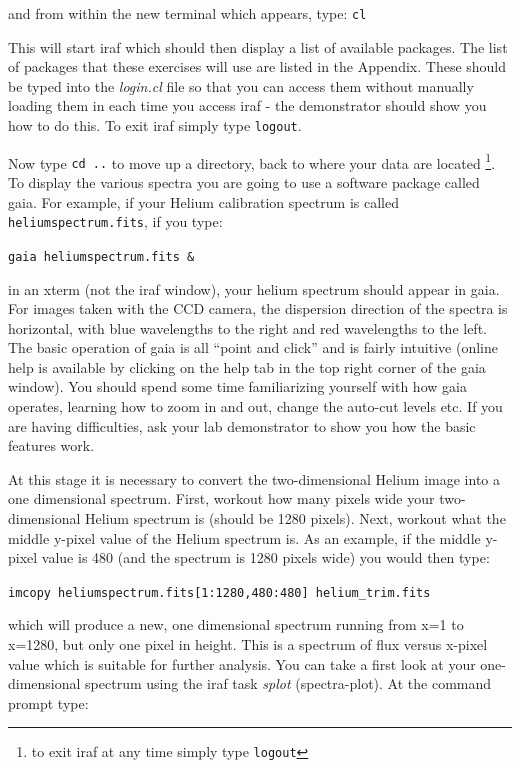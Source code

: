 \documentclass[12pt]{article}
\begin{document}
\noindent
and from within the new terminal which appears, type: {\tt cl}

\noindent
This will start {\sc iraf} which should then display a list of available
packages. The list of packages that these exercises will use are listed in the Appendix. These should be typed into the {\it login.cl} file so that you can access them without manually loading them in each time you access {\sc iraf} - the demonstrator should show you how to do this. To exit {\sc iraf} simply type {\tt logout}.

Now type {\tt cd ..} to move up a directory, back to where
your data are located \footnote{to exit {\sc iraf} at any time simply type {\tt logout}}. To display the various spectra you are going to use a software package called {\sc gaia}. For example, if your Helium calibration spectrum is
called {\tt heliumspectrum.fits}, if you type:

{\tt gaia heliumspectrum.fits \&}

in an xterm (not the {\sc iraf} window), your helium spectrum should appear in {\sc gaia}. For images taken with the CCD camera, the 
dispersion direction of the spectra is horizontal, with blue
wavelengths to the right and red wavelengths to the left. The basic
operation of {\sc gaia} is all ``point and
click'' and is fairly intuitive (online help is available by
clicking on the {\sc help} tab in the top right corner of the {\sc
gaia} window). You should spend some time familiarizing yourself with
how {\sc gaia} operates, learning how to zoom in and out, change the
auto-cut levels etc. If you are having difficulties, ask your lab
demonstrator to show you how the basic features work.

At this stage it is necessary to convert the two-dimensional Helium
image into a one dimensional spectrum. First, workout how many pixels
wide your two-dimensional Helium spectrum is (should be 1280 pixels). Next, workout what
the middle y-pixel value of the Helium spectrum is. As an example, if
the middle y-pixel value is 480 (and the spectrum is 1280 pixels wide) you would then type:

{\tt imcopy heliumspectrum.fits[1:1280,480:480] helium\verb,_,trim.fits}

which will produce a new, one dimensional spectrum running from x=1
to x=1280, but only one pixel in height. This is a spectrum of flux versus
x-pixel value which is suitable for further analysis. You can take a
first look at your one-dimensional spectrum using the {\sc iraf} task 
{\it splot} (spectra-plot). At the command prompt type:
\end{document}
